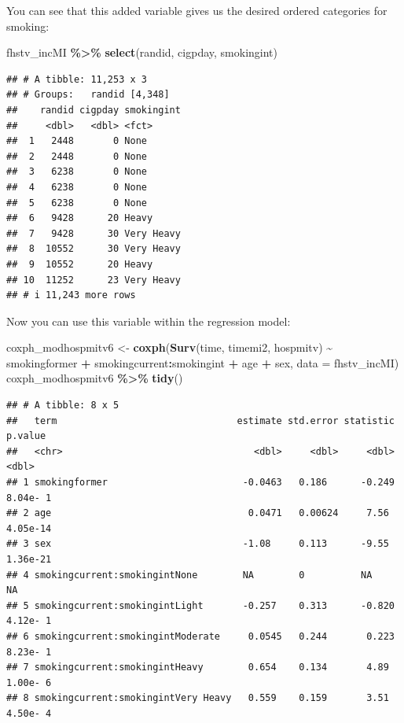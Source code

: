 \documentclass[
]{book}
\newenvironment{Shaded}{\begin{snugshade}}{\end{snugshade}}
\newcommand{\AttributeTok}[1]{\textcolor[rgb]{0.13,0.29,0.53}{#1}}
\newcommand{\FunctionTok}[1]{\textcolor[rgb]{0.13,0.29,0.53}{\textbf{#1}}}
\newcommand{\NormalTok}[1]{#1}
\newcommand{\OtherTok}[1]{\textcolor[rgb]{0.56,0.35,0.01}{#1}}
\newcommand{\SpecialCharTok}[1]{\textcolor[rgb]{0.81,0.36,0.00}{\textbf{#1}}}
\begin{document}
You can see that this added variable gives us the desired ordered categories for smoking:

\begin{Shaded}
\begin{Highlighting}[]
\NormalTok{fhstv\_incMI }\SpecialCharTok{\%\textgreater{}\%} 
  \FunctionTok{select}\NormalTok{(randid, cigpday, smokingint)}
\end{Highlighting}
\end{Shaded}

\begin{verbatim}
## # A tibble: 11,253 x 3
## # Groups:   randid [4,348]
##    randid cigpday smokingint
##     <dbl>   <dbl> <fct>     
##  1   2448       0 None      
##  2   2448       0 None      
##  3   6238       0 None      
##  4   6238       0 None      
##  5   6238       0 None      
##  6   9428      20 Heavy     
##  7   9428      30 Very Heavy
##  8  10552      30 Very Heavy
##  9  10552      20 Heavy     
## 10  11252      23 Very Heavy
## # i 11,243 more rows
\end{verbatim}

Now you can use this variable within the regression model:

\begin{Shaded}
\begin{Highlighting}[]
\NormalTok{coxph\_modhospmitv6 }\OtherTok{\textless{}{-}} \FunctionTok{coxph}\NormalTok{(}\FunctionTok{Surv}\NormalTok{(time, timemi2, hospmitv) }\SpecialCharTok{\textasciitilde{}} 
\NormalTok{                              smokingformer }\SpecialCharTok{+}\NormalTok{ smokingcurrent}\SpecialCharTok{:}\NormalTok{smokingint }\SpecialCharTok{+}\NormalTok{ age }\SpecialCharTok{+}\NormalTok{ sex, }
                            \AttributeTok{data =}\NormalTok{ fhstv\_incMI)}
\NormalTok{coxph\_modhospmitv6 }\SpecialCharTok{\%\textgreater{}\%}
  \FunctionTok{tidy}\NormalTok{()}
\end{Highlighting}
\end{Shaded}

\begin{verbatim}
## # A tibble: 8 x 5
##   term                                estimate std.error statistic   p.value
##   <chr>                                  <dbl>     <dbl>     <dbl>     <dbl>
## 1 smokingformer                        -0.0463   0.186      -0.249  8.04e- 1
## 2 age                                   0.0471   0.00624     7.56   4.05e-14
## 3 sex                                  -1.08     0.113      -9.55   1.36e-21
## 4 smokingcurrent:smokingintNone        NA        0          NA     NA       
## 5 smokingcurrent:smokingintLight       -0.257    0.313      -0.820  4.12e- 1
## 6 smokingcurrent:smokingintModerate     0.0545   0.244       0.223  8.23e- 1
## 7 smokingcurrent:smokingintHeavy        0.654    0.134       4.89   1.00e- 6
## 8 smokingcurrent:smokingintVery Heavy   0.559    0.159       3.51   4.50e- 4
\end{verbatim}
\end{document}
